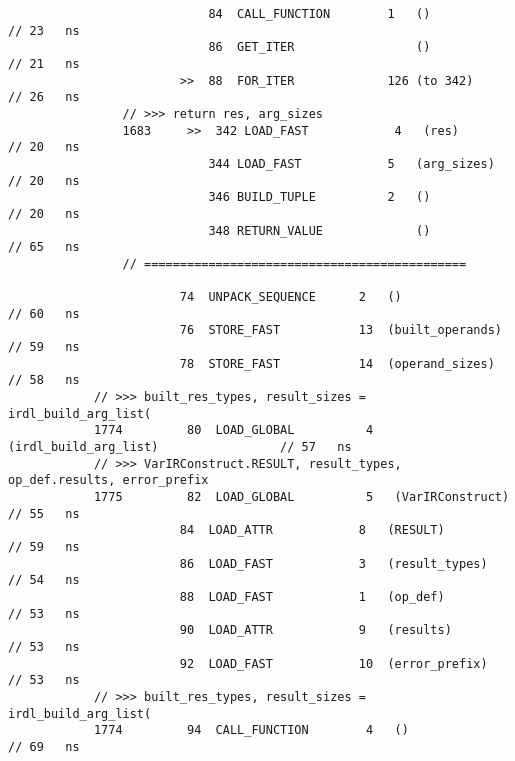 \begin{code}
\begin{verbatim}
                            84  CALL_FUNCTION        1   ()                                 // 23   ns
                            86  GET_ITER                 ()                                 // 21   ns
                        >>  88  FOR_ITER             126 (to 342)                           // 26   ns
                // >>> return res, arg_sizes
                1683     >>  342 LOAD_FAST            4   (res)                             // 20   ns
                            344 LOAD_FAST            5   (arg_sizes)                        // 20   ns
                            346 BUILD_TUPLE          2   ()                                 // 20   ns
                            348 RETURN_VALUE             ()                                 // 65   ns
                // =============================================

                        74  UNPACK_SEQUENCE      2   ()                                     // 60   ns
                        76  STORE_FAST           13  (built_operands)                       // 59   ns
                        78  STORE_FAST           14  (operand_sizes)                        // 58   ns
            // >>> built_res_types, result_sizes = irdl_build_arg_list(
            1774         80  LOAD_GLOBAL          4   (irdl_build_arg_list)                 // 57   ns
            // >>> VarIRConstruct.RESULT, result_types, op_def.results, error_prefix
            1775         82  LOAD_GLOBAL          5   (VarIRConstruct)                      // 55   ns
                        84  LOAD_ATTR            8   (RESULT)                               // 59   ns
                        86  LOAD_FAST            3   (result_types)                         // 54   ns
                        88  LOAD_FAST            1   (op_def)                               // 53   ns
                        90  LOAD_ATTR            9   (results)                              // 53   ns
                        92  LOAD_FAST            10  (error_prefix)                         // 53   ns
            // >>> built_res_types, result_sizes = irdl_build_arg_list(
            1774         94  CALL_FUNCTION        4   ()                                    // 69   ns


\end{verbatim}
\end{code}
